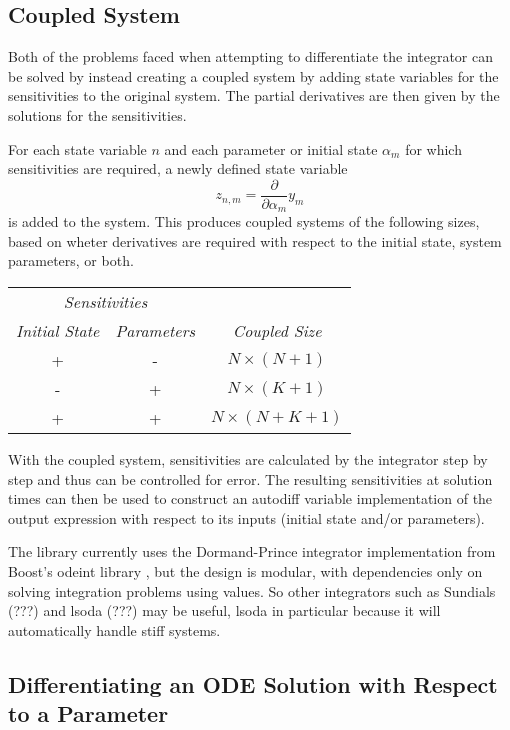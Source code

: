 \documentclass[10pt]{article}
\begin{document}
\subsection{Coupled System}

Both of the problems faced when attempting to differentiate the
integrator can be solved by instead creating a coupled system by
adding state variables for the sensitivities to the original system.
The partial derivatives are then given by the solutions for the
sensitivities.  

For each state variable $n$ and each parameter or initial state
$\alpha_m$ for which sensitivities are required, a newly defined state
variable
\[
z_{n,m} = \frac{\partial}{\partial \alpha_m} y_m
\]
is added to the system.  This produces coupled systems of the
following sizes, based on wheter derivatives are required with respect
to the initial state, system parameters, or both.
%
\begin{center}
\begin{tabular}{cc|c}
\multicolumn{2}{c|}{\it Sensitivities} &
\\
{\it Initial State} & {\it Parameters} & {\it Coupled Size}
\\ \hline
+ & - & $N \times (N + 1)$
\\
- & + & $N \times (K + 1)$ 
\\
+ & + & $N \times (N + K + 1)$
\end{tabular}
\end{center} 

With the coupled system, sensitivities are calculated by the
integrator step by step and thus can be controlled for error.  The
resulting sensitivities at solution times can then be used to
construct an autodiff variable implementation of the output expression
with respect to its inputs (initial state and/or parameters).

The  library currently uses the Dormand-Prince
integrator implementation from Boost's odeint library
\citep{AhnertMulansky:2014}, but the design is modular, with
dependencies only on solving integration problems using 
values.   So other integrators such as Sundials (???) and lsoda (???)
may be useful, lsoda in particular because it will automatically
handle stiff systems.


\subsection{Differentiating an ODE Solution with Respect to a Parameter}
\end{document}
